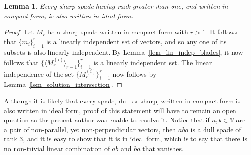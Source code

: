 \documentclass{birkjour}
\newtheorem{lem}[thm]{Lemma}
\theoremstyle{definition}
\theoremstyle{remark}
\numberwithin{equation}{section}
\newcommand{\V}{\mathbb{V}}
\begin{document}

\begin{lem}\label{lem_lin_indep_sharp_blades}
Every sharp spade having rank greater than one, and written in compact form, is also written in ideal form.
\end{lem}
\begin{proof}
Let $M_r$ be a sharp spade written in compact form with $r>1$.  It follows that
$\{m_i\}_{i=1}^r$ is a linearly independent set of vectors, and so any
one of its subsets is also linearly independent.  By Lemma~\ref{lem_lin_indep_blades},
it now follows that $\{\langle M_r^{(i)}\rangle_{r-1}\}_{i=1}^r$ is a linearly independent set.
The linear independence of the set $\{M_r^{(i)}\}_{i=1}^r$ now follows by Lemma~\ref{lem_solution_intersection}.
\end{proof}

Although it is likely that every spade, dull or sharp, written in compact form is also written in ideal form, proof
of this statement will have to remain an open question as the present author was enable to resolve it.
Notice that if $a,b\in\V$ are a pair of non-parallel, yet non-perpendicular vectors, then $aba$ is a dull spade of rank 3,
and it is easy to show that it is in ideal form, which is to say that there is no non-trivial linear combination of $ab$ and $ba$
that vanishes.
\end{document}
